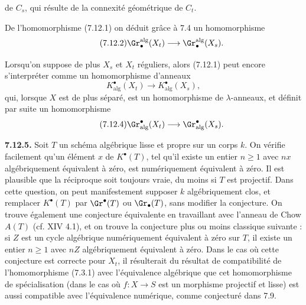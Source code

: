 
de \(C_s\), qui résulte de la connexité géométrique de \(C_t\).

De l'homomorphisme (7.12.1) on déduit grâce à 7.4 un homomorphisme
\begin{equation}\tag{7.12.2}
  \Gr_\bullet^{\mathrm{alg}}(X_t)\longrightarrow \Gr_\bullet^{\mathrm{alg}}(X_s).
\end{equation}

Lorsqu'on suppose de plus \(X_s\) et \(X_t\) réguliers, alors (7.12.1) peut encore s'interpréter comme un homomorphisme d'anneaux
\begin{equation}\tag{7.12.3}
  K^\bullet_{\mathrm{alg}}(X_t)\longrightarrow K^\bullet_{\mathrm{alg}}(X_s),
\end{equation}
qui, lorsque \(X\) est de plus séparé, est un homomorphisme de \(\lambda\)-anneaux, et définit par suite un homomorphisme
\begin{equation}\tag{7.12.4}
  \Gr^\bullet_{\mathrm{alg}}(X_t)\longrightarrow \Gr^\bullet_{\mathrm{alg}}(X_s).
\end{equation}

\textbf{7.12.5.} Soit \(T\) un schéma algébrique lisse et propre sur un corps \(k\). On vérifie facilement qu'un élément \(x\) de \(K^\bullet(T)\), tel qu'il existe un entier \(n\geq1\) avec \(nx\) algébriquement équivalent à zéro, est numériquement équivalent à zéro. Il est plausible que la réciproque soit toujours vraie, du moins si \(T\) est projectif. Dans cette question, on peut manifestement supposer \(k\) algébriquement clos, et remplacer \(K^\bullet(T)\) par \(\Gr^\bullet(T)\) ou \(\Gr_\bullet(T)\), sans modifier la conjecture. On trouve également une conjecture équivalente en travaillant avec l'anneau de Chow \(A(T)\) (cf. XIV 4.1), et on trouve la conjecture plus ou moins classique suivante : si \(Z\) est un cycle algébrique numériquement équivalent à zéro sur \(T\), il existe un entier \(n\geq1\) avec \(nZ\) algébriquement équivalent à zéro. Dans le cas où cette conjecture est correcte pour \(X_t\), il résulterait du résultat de compatibilité de l'homomorphisme (7.3.1) avec l'équivalence algébrique que cet homomorphisme de spécialisation (dans le cas où \(f:X\to S\) est un morphisme projectif et lisse) est aussi compatible avec l'équivalence numérique, comme conjecturé dans 7.9.

